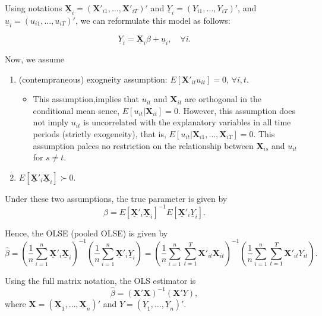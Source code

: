 \documentclass[
  12pt,
]{article}
\providecommand{\tightlist}{%
  \setlength{\itemsep}{0pt}\setlength{\parskip}{0pt}}
\begin{document}
Using notations \(\underline{\mathbf{X}}_i = (\mathbf{X}'_{i1}, \ldots, \mathbf{X}'_{iT})'\)
and \(\underline{Y}_i = (Y_{i1}, \ldots, Y_{iT})'\), and \(\underline{u}_i = (u_{i1}, \ldots, u_{iT})'\),
we can reformulate this model as follows:

\[
  \underline{Y}_i = \underline{\mathbf{X}}_i \beta + \underline{u}_i, \quad \forall i.
\]

Now, we assume

\begin{enumerate}
\def\labelenumi{\arabic{enumi}.}
\tightlist
\item
  (contempraneous) exogneity assumption: \(E[\mathbf{X}'_{it}u_{it}] = 0\), \(\forall i, t\).

  \begin{itemize}
  \tightlist
  \item
    This assumption,implies that \(u_{it}\) and \(\mathbf{X}_{it}\) are orthogonal in the conditional mean sence, \(E[u_{it} | \mathbf{X}_{it}] = 0\). However, this assumption does not imply \(u_{it}\) is uncorrelated with the explanatory variables in all time periods (strictly exogeneity), that is, \(E[u_{it} | \mathbf{X}_{i1}, \ldots, \mathbf{X}_{iT}] = 0\). This assumption palces no restriction on the relationship between \(\mathbf{X}_{is}\) and \(u_{it}\) for \(s\not=t\).
  \end{itemize}
\item
  \(E[\underline{\mathbf{X}}'_i\underline{\mathbf{X}}_i] \succ 0\).
\end{enumerate}

Under these two assumptions, the true parameter is given by
\[
  \beta = E[\underline{\mathbf{X}}'_i\underline{\mathbf{X}}_i]^{-1} E[\underline{\mathbf{X}}'_i\underline{Y}_i].
\]

Hence, the OLSE (pooled OLSE) is given by
\[
  \hat{\beta} 
  = \left( \frac{1}{n} \sum_{i=1}^n \underline{\mathbf{X}}'_i\underline{\mathbf{X}}_i \right)^{-1}
  \left( \frac{1}{n} \sum_{i=1}^n \underline{\mathbf{X}}'_i\underline{Y}_i \right)
  = \left( \frac{1}{n} \sum_{i=1}^n \sum_{t=1}^T \mathbf{X}'_{it} \mathbf{X}_{it} \right)^{-1}
  \left( \frac{1}{n} \sum_{i=1}^n \sum_{t=1}^T \mathbf{X}'_{it} Y_{it} \right).
\]

Using the full matrix notation, the OLS estimator is
\[
  \hat{\beta} = (\mathbf{X}' \mathbf{X})^{-1} (\mathbf{X}' Y),
\]
where \(\mathbf{X} = (\underline{\mathbf{X}}_1, \ldots, \underline{\mathbf{X}}_n)'\) and
\(Y = (\underline{Y}_1, \ldots, \underline{Y}_n)'\).
\end{document}
